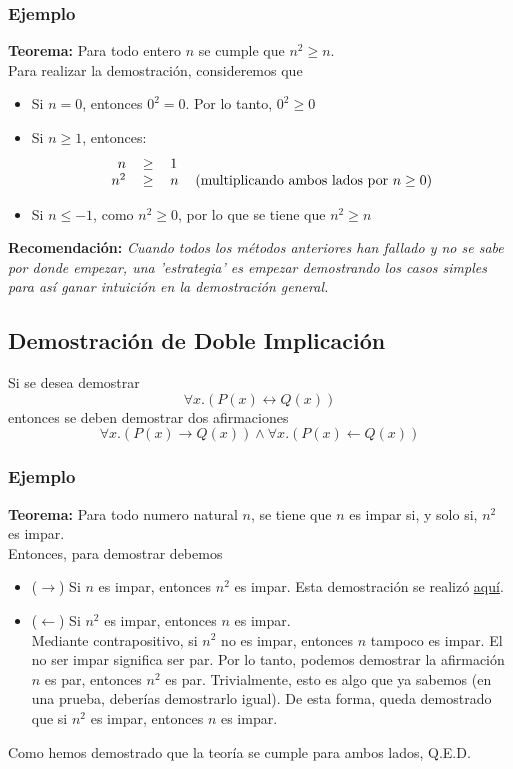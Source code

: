 \documentclass[../main.tex]{subfiles}
\begin{document}
\subsubsection*{Ejemplo}
\textbf{Teorema:} Para todo entero $n$ se cumple que $n^2 \geq n$.\\
Para realizar la demostración, consideremos que
\begin{itemize}
    \item Si $n = 0$, entonces $0^2 = 0$. Por lo tanto, $0^2 \geq 0$
    \item Si $n \geq 1$, entonces:
    \[
        \begin{tabular}{rcll}
            $n$ & $\geq$ & $1$\\
            $n^2$ & $\geq$ & $n$ & (multiplicando ambos lados por $n \geq 0$)\\
        \end{tabular}
    \]
    \item Si $n \leq -1$, como $n^2 \geq 0$, por lo que se tiene que $n^2 \geq n$
\end{itemize}

\textbf{Recomendación:} \textit{Cuando todos los métodos anteriores han fallado y no se sabe por donde empezar, una 'estrategia' es empezar demostrando los casos simples para así ganar intuición en la demostración general.}
    

\subsection{Demostración de Doble Implicación}
Si se desea demostrar
\[ \forall x . (P(x) \leftrightarrow Q(x)) \]
entonces se deben demostrar dos afirmaciones
\[ \forall x . (P(x) \rightarrow Q(x)) \wedge \forall x . (P(x) \leftarrow Q(x)) \]
\subsubsection*{Ejemplo}
\textbf{Teorema:} Para todo numero natural $n$, se tiene que $n$ es impar si, y solo si, $n^2$ es impar.\\
Entonces, para demostrar debemos
\begin{itemize}
    \item ($\rightarrow$) Si $n$ es impar, entonces $n^2$ es impar. Esta demostración se realizó \hyperref[sec:nimpar]{aquí}.
    \item ($\leftarrow$) Si $n^2$ es impar, entonces $n$ es impar.\\
    Mediante contrapositivo, si $n^2$ no es impar, entonces $n$ tampoco es impar. El no ser impar significa ser par. Por lo tanto, podemos demostrar la afirmación $n$ es par, entonces $n^2$ es par. Trivialmente, esto es algo que ya sabemos (en una prueba, deberías demostrarlo igual). De esta forma, queda demostrado que si $n^2$ es impar, entonces $n$ es impar.
\end{itemize}
Como hemos demostrado que la teoría se cumple para ambos lados, Q.E.D.
\end{document}
